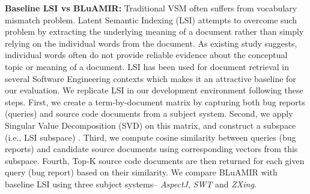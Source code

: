 \documentclass[conference]{IEEEtran}
\begin{document}
\textbf{Baseline LSI vs BLuAMIR:} Traditional VSM often suffers from vocabulary mismatch problem. Latent Semantic Indexing (LSI)
attempts to overcome such problem by extracting the underlying meaning of a document rather than simply relying on the individual words from the document. As existing study \cite{LSIindexing} suggests, individual words often do not provide reliable evidence about the conceptual topic or meaning of a document. LSI has been used for document retrieval in several Software Engineering contexts \cite{MarcusLSI,MarcusMaletic} which makes it an attractive baseline for our evaluation. We replicate LSI in our development environment following these steps. First,    
we create a term-by-document matrix by capturing both bug reports (queries) and source code documents from a subject system. Second, 
we apply Singular Value Decomposition (SVD) on this matrix, and construct a subspace (i.e., LSI subspace) \cite{SaltonMIR}. 
Third, we compute cosine similarity between queries (bug reports) and candidate source documents using corresponding vectors from  this subspace. Fourth, Top-K source code documents are then returned for each given query (bug report) based on their similarity.  
We compare BLuAMIR with baseline LSI using three subject systems-- \emph{AspectJ}, \emph{SWT} and \emph{ZXing}.
\end{document}
